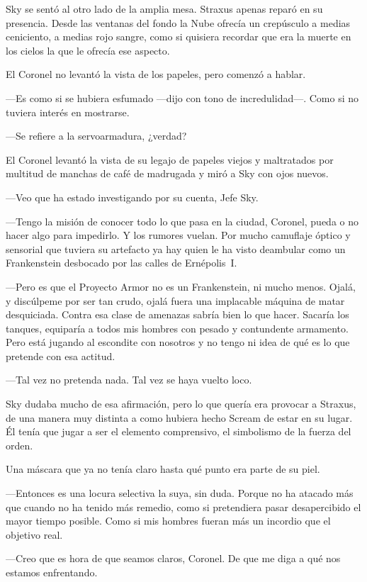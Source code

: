Sky se sentó al otro lado de la amplia mesa. Straxus apenas reparó en su presencia. Desde las ventanas del fondo la Nube ofrecía un crepúsculo a medias ceniciento, a medias rojo sangre, como si quisiera recordar que era la muerte en los cielos la que le ofrecía ese aspecto.

El Coronel no levantó la vista de los papeles, pero comenzó a hablar.

---Es como si se hubiera esfumado ---dijo con tono de incredulidad---. Como si no tuviera interés en mostrarse.

---Se refiere a la servoarmadura, ¿verdad?

El Coronel levantó la vista de su legajo de papeles viejos y maltratados por multitud de manchas de café de madrugada y miró a Sky con ojos nuevos.

---Veo que ha estado investigando por su cuenta, Jefe Sky.

---Tengo la misión de conocer todo lo que pasa en la ciudad, Coronel, pueda o no hacer algo para impedirlo. Y los rumores vuelan. Por mucho camuflaje óptico y sensorial que tuviera su artefacto ya hay quien le ha visto deambular como un Frankenstein desbocado por las calles de Ernépolis~I.

---Pero es que el Proyecto Armor no es un Frankenstein, ni mucho menos. Ojalá, y discúlpeme por ser tan crudo, ojalá fuera una implacable máquina de matar desquiciada. Contra esa clase de amenazas sabría bien lo que hacer. Sacaría los tanques, equiparía a todos mis hombres con pesado y contundente armamento. Pero está jugando al escondite con nosotros y no tengo ni idea de qué es lo que pretende con esa actitud.

---Tal vez no pretenda nada. Tal vez se haya vuelto loco.

Sky dudaba mucho de esa afirmación, pero lo que quería era provocar a Straxus, de una manera muy distinta a como hubiera hecho Scream de estar en su lugar. Él tenía que jugar a ser el elemento comprensivo, el simbolismo de la fuerza del orden.

Una máscara que ya no tenía claro hasta qué punto era parte de su piel.

---Entonces es una locura selectiva la suya, sin duda. Porque no ha atacado más que cuando no ha tenido más remedio, como si pretendiera pasar desapercibido el mayor tiempo posible. Como si mis hombres fueran más un incordio que el objetivo real.

---Creo que es hora de que seamos claros, Coronel. De que me diga a qué nos estamos enfrentando.

